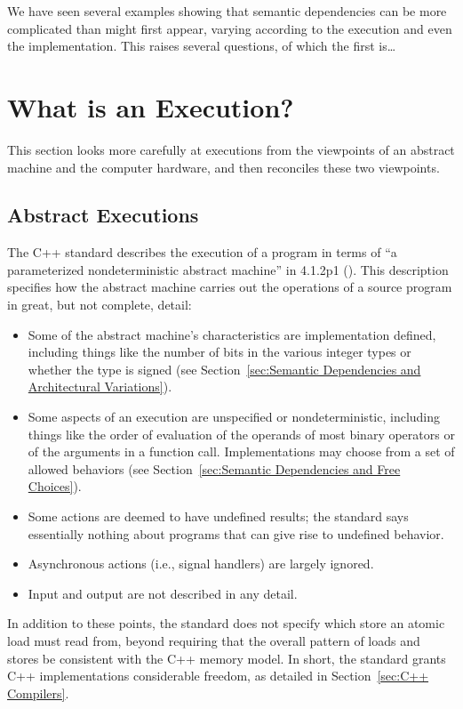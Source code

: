 \medskip

We have seen several examples showing that semantic dependencies can
be more complicated than might first appear, varying according to the
execution and even the implementation.
This raises several questions, of which the first is\dots

\section{What is an Execution?}
\label{sec:What is an Execution?}

This section looks more carefully at executions from the viewpoints of
an abstract machine and the computer hardware, and then reconciles
these two viewpoints.

\subsection{Abstract Executions}
\label{sec:Abstract Executions}

The C++ standard describes the execution of a program in terms of
``a parameterized nondeterministic abstract machine'' in 4.1.2p1
().
This description specifies how the abstract machine carries out the
operations of a source program in great, but not complete, detail:
\begin{itemize}
\item	Some of the abstract machine's characteristics are
	implementation defined, including things like the number of
	bits in the various integer types
	or whether the  type is signed (see
	Section~\ref{sec:Semantic Dependencies and Architectural Variations}).
\item	Some aspects of an execution are unspecified or nondeterministic,
	including things like the order of evaluation of the operands
	of most binary operators or of the arguments in a function call.
	Implementations may choose from a set of allowed behaviors
	(see
	Section~\ref{sec:Semantic Dependencies and Free Choices}).
\item	Some actions are deemed to have undefined results; the standard
	says essentially nothing about programs that can give rise to
	undefined behavior.
\item	Asynchronous actions (i.e., signal handlers) are largely ignored.
\item	Input and output are not described in any detail.
\end{itemize}
In addition to these points, the standard does not specify which store
an atomic load must read from, beyond requiring that the overall
pattern of loads and stores be consistent with the C++ memory model.
In short, the standard grants C++ implementations considerable freedom,
as detailed in
Section~\ref{sec:C++ Compilers}.


